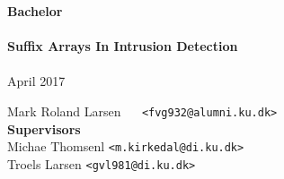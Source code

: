 \documentclass[a4paper,oneside]{memoir}
\begin{document}
    \thispagestyle{empty}
    \begin{adjustwidth}{-3cm}{-1.5cm}
    \vspace*{1cm}
    \textbf{\Huge Bachelor} \\
    \vspace*{2.5cm} \\
    \textbf{\Huge Suffix Arrays In Intrusion Detection} \\
    \vspace*{.1cm} \\
    {\huge April 2017} \\
    \begin{tabbing}
    Mark Roland Larsen ~~ \= \texttt{<fvg932@alumni.ku.dk>} 
    \\[12.1cm]
    \textbf{\Large Supervisors} \\
    Michae Thomsenl\> \texttt{<m.kirkedal@di.ku.dk>} \\
    Troels Larsen\> \texttt{<gvl981@di.ku.dk>} \\
    \end{tabbing}
    \end{adjustwidth}
    \ClearWallPaper
\end{document}
